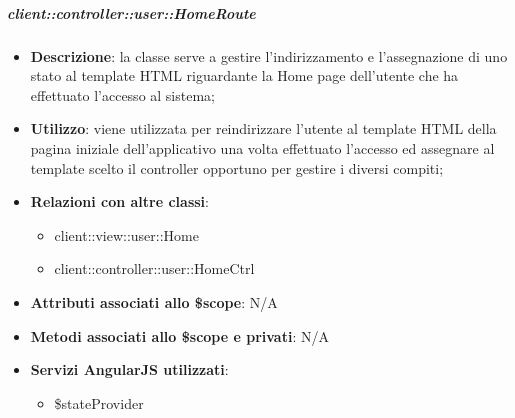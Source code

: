 		\subparagraph{client::controller::user::HomeRoute} %
		\label{subp:bdsm_app_client_controller_user_homerouteconfig}
			\begin{itemize}
				\item \textbf{Descrizione}: la classe serve a gestire l'indirizzamento e l'assegnazione di uno stato al template HTML riguardante la Home page dell'utente che ha effettuato l'accesso al sistema;
				\item \textbf{Utilizzo}: viene utilizzata per reindirizzare l'utente al template HTML della pagina iniziale dell'applicativo una volta effettuato l'accesso ed assegnare al template scelto il controller opportuno per gestire i diversi compiti;
				\item \textbf{Relazioni con altre classi}:
					\begin{itemize}
						\item client::view::user::Home
						\item client::controller::user::HomeCtrl
					\end{itemize}
				\item \textbf{Attributi associati allo \$scope}: N/A
				\item \textbf{Metodi associati allo \$scope e privati}: N/A
				\item \textbf{Servizi AngularJS utilizzati}:
					\begin{itemize}
						\item \$stateProvider
					\end{itemize}
			\end{itemize}

